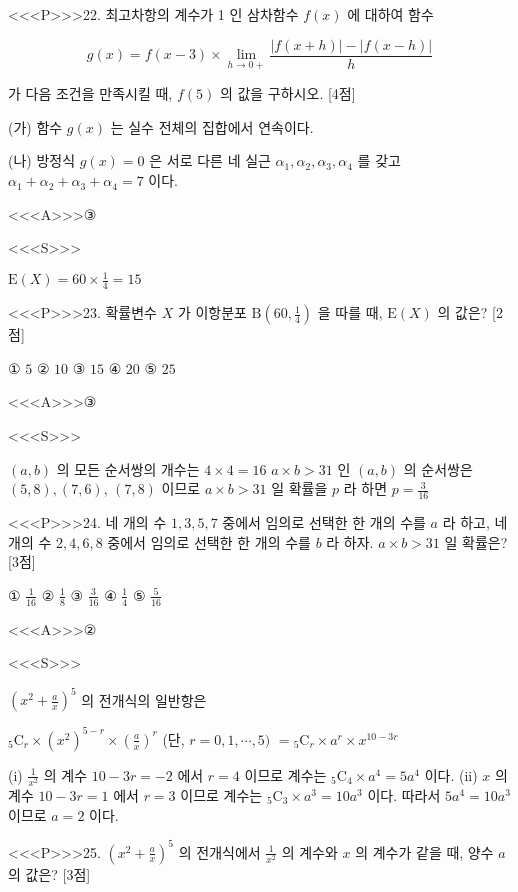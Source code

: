 \documentclass{oblivoir}
\begin{document}
<<<P>>>22. 최고차항의 계수가 1 인 삼차함수 $f(x)$ 에 대하여 함수

$$g(x)=f(x-3) \times \lim _{h \rightarrow 0+} \frac{|f(x+h)|-|f(x-h)|}{h}$$

가 다음 조건을 만족시킬 때, $f(5)$ 의 값을 구하시오. [4점]

(가) 함수 $g(x)$ 는 실수 전체의 집합에서 연속이다.

(나) 방정식 $g(x)=0$ 은 서로 다른 네 실근 $\alpha_{1}, \alpha_{2}, \alpha_{3}, \alpha_{4}$ 를 갖고 $\alpha_{1}+\alpha_{2}+\alpha_{3}+\alpha_{4}=7$ 이다.

<<<A>>>③

<<<S>>>

$\mathrm{E}(X)=60 \times \frac{1}{4}=15$


<<<P>>>23. 확률변수 $X$ 가 이항분포 $\mathrm{B}\left(60, \frac{1}{4}\right)$ 을 따를 때, $\mathrm{E}(X)$ 의 값은? [2점]

① $5$
② $10$
③ $15$
④ $20$
⑤ $25$

<<<A>>>③

<<<S>>>


$(a, b)$ 의 모든 순서쌍의 개수는 $4 \times 4=16$
$a \times b>31$ 인 $(a, b)$ 의 순서쌍은 $(5,8),(7,6)$,
$(7,8)$ 이므로
$a \times b>31$ 일 확률을 $p$ 라 하면
$p=\frac{3}{16}$


<<<P>>>24. 네 개의 수 $1,3,5,7$ 중에서 임의로 선택한 한 개의 수를 $a$ 라 하고, 네 개의 수 $2,4,6,8$ 중에서 임의로 선택한 한 개의 수를 $b$ 라 하자. $a \times b>31$ 일 확률은? [3점]

① $\frac{1}{16}$
② $\frac{1}{8}$
③ $\frac{3}{16}$
④ $\frac{1}{4}$
⑤ $\frac{5}{16}$

<<<A>>>②

<<<S>>>



$\left(x^{2}+\frac{a}{x}\right)^{5}$ 의 전개식의 일반항은


${ }_{5} \mathrm{C}_{r} \times\left(x^{2}\right)^{5-r} \times\left(\frac{a}{x}\right)^{r}$ (단, $r=0,1, \cdots, 5)$
$={ }_{5} \mathrm{C}_{r} \times a^{r} \times x^{10-3 r}$


(i) $\frac{1}{x^{2}}$ 의 계수
$10-3 r=-2$ 에서 $r=4$ 이므로
계수는 ${ }_{5} \mathrm{C}_{4} \times a^{4}=5 a^{4}$ 이다.
(ii) $x$ 의 계수
$10-3 r=1$ 에서 $r=3$ 이므로
계수는 ${ }_{5} \mathrm{C}_{3} \times a^{3}=10 a^{3}$ 이다.
따라서 $5 a^{4}=10 a^{3}$ 이므로 $a=2$ 이다.


<<<P>>>25. $\left(x^{2}+\frac{a}{x}\right)^{5}$ 의 전개식에서 $\frac{1}{x^{2}}$ 의 계수와 $x$ 의 계수가 같을 때, 양수 $a$ 의 값은? [3점]
\end{document}
